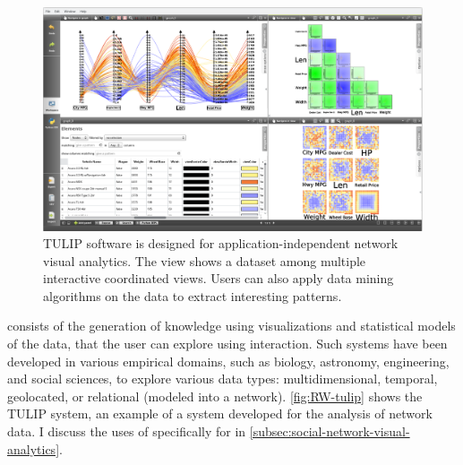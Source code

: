 \begin{figure}[!ht]
    \centering %
    \includegraphics[width=1\textwidth]{static/figures/RelatedWork/TULIP}
    \caption{TULIP software is designed for application-independent network visual analytics\cite{auberTULIP2017}. The view shows a dataset among multiple interactive coordinated views. Users can also apply data mining algorithms on the data to extract interesting patterns.}
    \label{fig:RW-tulip}
\end{figure}

\va consists of the generation of knowledge using visualizations and statistical models of the data, that the user can explore using interaction.
Such systems have been developed in various empirical domains, such as biology, astronomy, engineering, and social sciences, to explore various data types: multidimensional, temporal, geolocated, or relational (\ie modeled into a network).
\autoref{fig:RW-tulip} shows the TULIP system, an example of a \va system developed for the analysis of network data.
I discuss the uses of \va specifically for \sna in \autoref{subsec:social-network-visual-analytics}.



